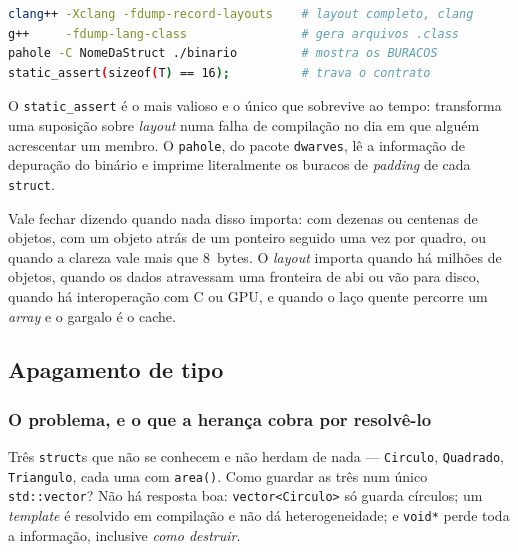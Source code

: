 \begin{lstlisting}[style=bt, language=bash,
    caption={As quatro ferramentas de inspeção de \emph{layout}.}]
clang++ -Xclang -fdump-record-layouts    # layout completo, clang
g++     -fdump-lang-class                # gera arquivos .class
pahole -C NomeDaStruct ./binario         # mostra os BURACOS
static_assert(sizeof(T) == 16);          # trava o contrato
\end{lstlisting}

O \texttt{static\_assert} é o mais valioso e o único que sobrevive ao tempo:
transforma uma suposição sobre \emph{layout} numa falha de compilação no dia em
que alguém acrescentar um membro. O \texttt{pahole}, do pacote
\texttt{dwarves}, lê a informação de depuração do binário e imprime literalmente
os buracos de \emph{padding} de cada \texttt{struct}.

Vale fechar dizendo quando nada disso importa: com dezenas ou centenas de
objetos, com um objeto atrás de um ponteiro seguido uma vez por quadro, ou
quando a clareza vale mais que 8~bytes. O \emph{layout} importa quando há
milhões de objetos, quando os dados atravessam uma fronteira de \gls{abi} ou vão
para disco, quando há interoperação com C ou GPU, e quando o laço quente
percorre um \emph{array} e o gargalo é o cache.

\subsection{Apagamento de tipo}
\label{sec:erasure}

\subsubsection{O problema, e o que a herança cobra por resolvê-lo}

\begin{porque}
Três \texttt{struct}s que não se conhecem e não herdam de nada ---
\texttt{Circulo}, \texttt{Quadrado}, \texttt{Triangulo}, cada uma com
\texttt{area()}. Como guardar as três num único \texttt{std::vector}? Não há
resposta boa: \texttt{vector<Circulo>} só guarda círculos; um \emph{template} é
resolvido em compilação e não dá heterogeneidade; e \texttt{void*} perde toda a
informação, inclusive \emph{como destruir}.
\end{porque}


